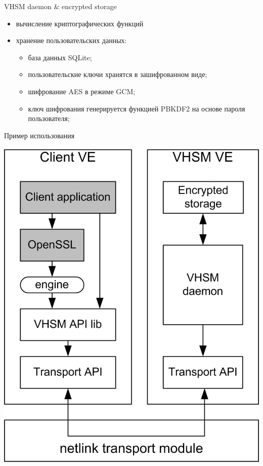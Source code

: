 \documentclass[utf8, 11pt]{beamer}
\begin{document}
\begin{frame}{VHSM daemon \& encrypted storage}

\begin{itemize}
\item вычисление криптографических функций
\item хранение пользовательских данных:
	\begin{itemize}
	\item база данных SQLite;
	\item пользовательские ключи хранятся в зашифрованном виде;
	\item шифрование AES в режиме GCM;
	\item ключ шифрования генерируется функцией PBKDF2 на основе пароля пользователя;
	\end{itemize}
\end{itemize}

\vspace*{\fill}

\end{frame}

\begin{frame}{Пример использования}
\begin{center}
\includegraphics[scale=0.75]{img3-2}
\end{center}
\end{frame}
\end{document}
